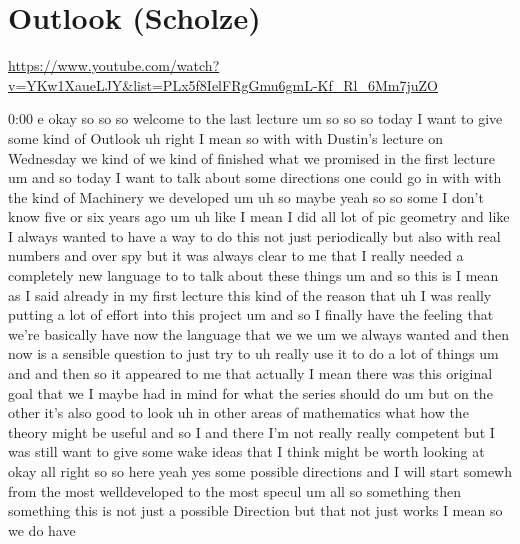 
\section{\ufs Outlook (Scholze)}

\url{https://www.youtube.com/watch?v=YKw1XaueLJY&list=PLx5f8IelFRgGmu6gmL-Kf_Rl_6Mm7juZO}
\renewcommand{\yt}[2]{\href{https://www.youtube.com/watch?v=YKw1XaueLJY&list=PLx5f8IelFRgGmu6gmL-Kf_Rl_6Mm7juZO&t=#1}{#2}}
\vspace{1em}

\begin{unfinished}{0:00}
  e
okay  so  so  so  welcome  to  the  last
lecture  um  so  so  so  today  I  want  to  give
some  kind  of  Outlook
uh  right  I  mean  so  with  with  Dustin's
lecture  on  Wednesday  we  kind  of  we  kind
of  finished  what  we  promised  in  the
first  lecture
um  and  so  today  I  want  to  talk  about
some  directions  one  could  go  in  with
with  the  kind  of  Machinery  we  developed
um
uh  so  maybe  yeah
so  so  some  I  don't  know  five  or  six
years  ago
um
uh
like  I  mean  I  did  all  lot  of  pic
geometry  and  like  I  always  wanted  to
have  a  way  to  do  this  not  just
periodically  but  also  with  real  numbers
and  over  spy  but  it  was  always  clear  to
me  that  I  really  needed  a  completely  new
language  to  to  talk  about  these  things
um  and  so
this  is  I  mean  as  I  said  already  in  my
first  lecture  this  kind  of  the  reason
that  uh  I  was  really  putting  a  lot  of
effort  into  this  project  um  and  so  I
finally  have  the  feeling  that  we're
basically  have  now  the  language  that  we
we
um  we  always  wanted  and  then  now  is  a
sensible  question  to  just  try
to  uh  really  use  it  to  do  a  lot  of
things  um
and  and  then  so  it  appeared  to  me  that
actually  I  mean  there  was  this  original
goal  that  we  I  maybe  had  in  mind  for
what  the  series  should  do  um  but  on  the
other  it's  also  good  to  look  uh  in  other
areas  of  mathematics  what  how  the  theory
might  be  useful  and  so  I  and  there  I'm
not  really  really  competent  but  I  was
still  want  to  give  some  wake  ideas  that
I  think  might  be  worth  looking
at  okay  all  right  so  so  here  yeah  yes
some  possible  directions  and  I  will
start  somewh  from  the  most  welldeveloped
to  the  most
specul
um  all  so  something  then  something  this
is  not  just  a  possible  Direction  but
that  not  just  works  I  mean  so  we  do  have

\end{unfinished}
